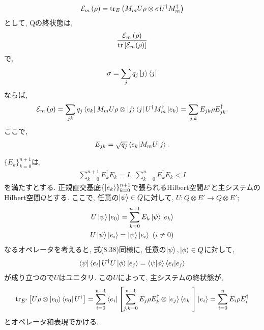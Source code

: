 \begin{ex}
    \label{ex8.7}
    \begin{align*}
        \mathcal{E}_m \left( \rho \right)
        =
        \mathrm{tr}_E \left( M_m U \rho \otimes \sigma U^\dagger M_m^\dagger \right)
    \end{align*}
    として, Qの終状態は,
    \begin{align*}
        \frac{\mathcal{E}_m \left( \rho \right)}{\mathrm{tr} \left[ \mathcal{E}_m(\rho)\right]}
    \end{align*}
    で,
    \begin{align*}
        \sigma = \sum_j q_j \ket{j}\bra{j}
    \end{align*}
    ならば,
    \begin{align*}
        \mathcal{E}_m \left( \rho \right)
        =
        \sum_{jk} q_j \bra{e_k} M_m U \rho \otimes \ket{j}\bra{j} U^\dagger M_m^\dagger \ket{e_k}
        =
        \sum_{j,k}E_{jk} \rho E_{jk}^\dagger.
    \end{align*}
    ここで,
    \begin{align*}
        E_{jk} = \sqrt{q_j} \braket{e_k | M_m U | j}.
    \end{align*}
\end{ex}

\begin{ex}
    \label{ex8.8}
    $\{E_k\}_{k=0}^{n+1}$は,
    \begin{align*}
        \sum_{k=0}^{n+1} E_k^\dagger E_k = I, \   \sum_{k=0}^{n} E_k^\dagger E_k < I
    \end{align*}
    を満たすとする. 正規直交基底$\{ \ket{e_k} \}_{k=0}^{n+1}$で張られるHilbert空間$E'$と主システムのHilbert空間$Q$とする. ここで, 任意の$\ket{\psi} \in Q$に対して, $U: Q \otimes E' \to Q \otimes E'$;
    \begin{align*}
        U \ket{\psi} \ket{e_0} = \sum_{k=0}^{n+1} E_k \ket{\psi} \ket{e_k} \\
        U \ket{\psi} \ket{e_i} = \ket{\psi} \ket{e_i} \ (i \neq 0 )
    \end{align*}
    なるオペレータを考えると, 式(8.38)同様に, 任意の$\ket{\psi}, \ket{\phi} \in Q$に対して,
    \begin{align*}
        \bra{\psi}\bra{e_i} U^\dagger U \ket{\phi} \ket{e_j}= \braket{\psi|\phi} \braket{e_i|e_j}
    \end{align*}
    が成り立つので$U$はユニタリ. この$U$によって, 主システムの終状態が,
    \begin{align*}
        \mathrm{tr}_{E'} \left[ U \rho \otimes \ket{e_0} \bra{e_0} U^\dagger \right]
        =
        \sum_{i=0}^{n+1}
        \bra{e_i}
        \left[
            \sum_{j,k=0}^{n+1} E_j \rho E_k^\dagger \otimes \ket{e_j} \bra{e_k}
            \right]
        \ket{e_i}
        =
        \sum_{i=0}^{n} E_i \rho E_i^\dagger
    \end{align*}
    とオペレータ和表現でかける.
\end{ex}

